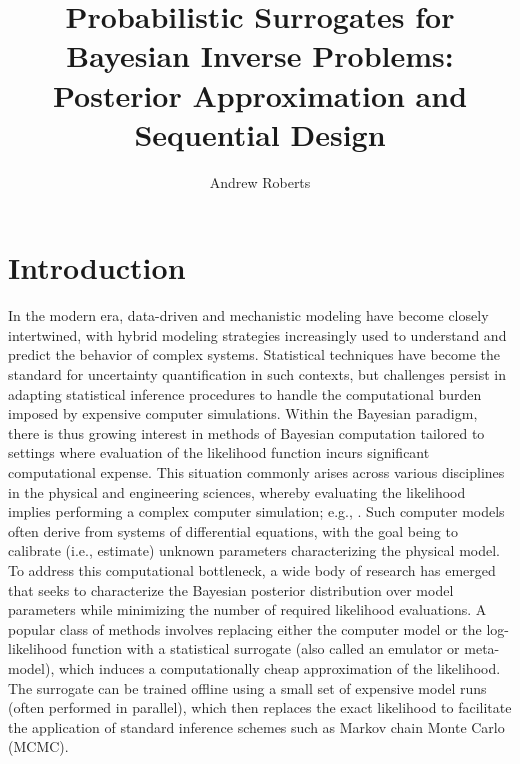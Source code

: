 \documentclass[12pt]{article}
\title{Probabilistic Surrogates for Bayesian Inverse Problems: Posterior Approximation and Sequential Design}
\author{Andrew Roberts}
\begin{document}
\maketitle

\section{Introduction}
In the modern era, data-driven and mechanistic modeling have become closely intertwined, with hybrid modeling strategies 
increasingly used to understand and predict the behavior of complex systems. Statistical techniques have become 
the standard for uncertainty quantification in such contexts, but challenges persist in adapting statistical inference procedures
to handle the computational burden imposed by expensive computer simulations. 
Within the Bayesian paradigm, there is thus growing interest in methods of Bayesian computation tailored to settings 
where evaluation of the likelihood function incurs significant computational expense. 
This situation commonly arises across various disciplines in the physical and engineering sciences, whereby evaluating 
the likelihood implies performing a complex computer simulation; e.g., \citep{ESM_modeling_2pt0,FerEmulation}. 
Such computer models often derive from systems of differential equations, with the goal being to calibrate (i.e., estimate) 
unknown parameters characterizing the physical model.
To address this computational bottleneck, a wide body of research has emerged that seeks to characterize the Bayesian 
posterior distribution over model parameters while minimizing the number of required likelihood evaluations. 
A popular class of methods involves replacing either the computer model or the log-likelihood function with a statistical 
surrogate (also called an emulator or meta-model), which induces a computationally cheap approximation of the likelihood.
The surrogate can be trained offline \citep{modularization} using a small set of expensive model runs (often performed in 
parallel), which then replaces the exact likelihood to facilitate the application of 
standard inference schemes such as Markov chain Monte Carlo (MCMC).
\end{document}
